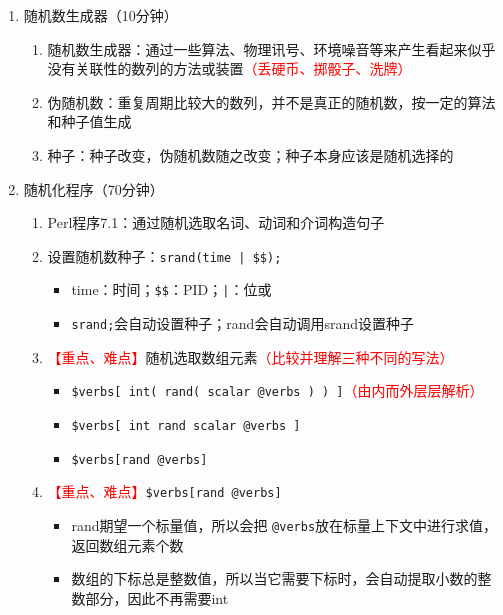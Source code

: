 \documentclass{TIJMUjiaoanLL}
\begin{document}
\begin{enumerate}
\begin{enumerate}
    \end{enumerate}
  \item 随机数生成器（10分钟）
    \begin{enumerate}
      \item 随机数生成器：通过一些算法、物理讯号、环境噪音等来产生看起来似乎没有关联性的数列的方法或装置\textcolor{red}{（丢硬币、掷骰子、洗牌）}
      \item 伪随机数：重复周期比较大的数列，并不是真正的随机数，按一定的算法和种子值生成
      \item 种子：种子改变，伪随机数随之改变；种子本身应该是随机选择的
    \end{enumerate}
  \item 随机化程序（70分钟）
    \begin{enumerate}
      \item Perl程序7.1：通过随机选取名词、动词和介词构造句子
      \item 设置随机数种子：\verb=srand(time | $$);=
	\begin{itemize}
	  \item time：时间；\verb|$$|：PID；\verb=|=：位或
	  \item \verb|srand;|会自动设置种子；rand会自动调用srand设置种子
	\end{itemize}
      \item \textcolor{red}{【重点、难点】}随机选取数组元素\textcolor{red}{（比较并理解三种不同的写法）}
	\begin{itemize}
	  \item \verb|$verbs[ int( rand( scalar @verbs ) ) ]|\textcolor{red}{（由内而外层层解析）}
	  \item \verb|$verbs[ int rand scalar @verbs ]|
	  \item \verb|$verbs[rand @verbs]|
	\end{itemize}
      \item \textcolor{red}{【重点、难点】}\verb|$verbs[rand @verbs]|
	\begin{itemize}
	  \item rand期望一个标量值，所以会把 \verb|@verbs|放在标量上下文中进行求值，返回数组元素个数
	  \item 数组的下标总是整数值，所以当它需要下标时，会自动提取小数的整数部分，因此不再需要int
	\end{itemize}
    \end{enumerate}

\otherTail
\newpage
\otherHeader


\end{enumerate}
\end{document}
